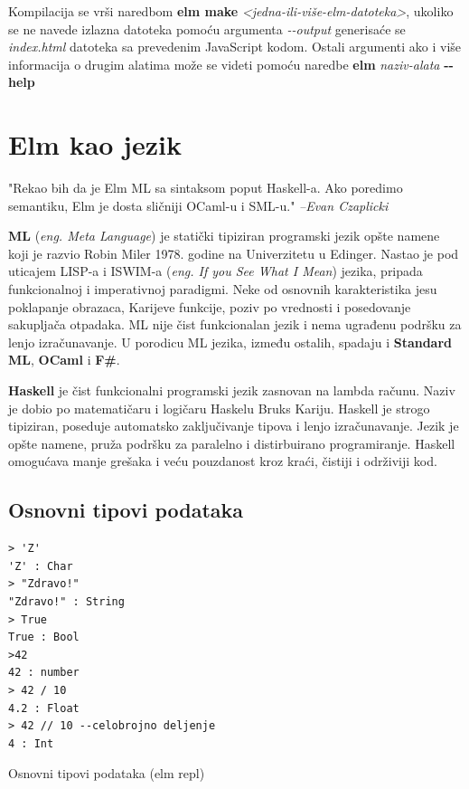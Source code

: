 \documentclass[12pt,oneside]{memoir}
\begin{document}
Kompilacija se vrši naredbom \textbf{elm make} \emph{<jedna-ili-više-elm-datoteka>},
ukoliko se ne navede izlazna datoteka pomoću argumenta \emph{-{}-output} generisaće 
se \emph{index.html} datoteka sa prevedenim JavaScript kodom. Ostali argumenti ako i
više informacija o drugim alatima može se videti pomoću naredbe \textbf{elm} 
\emph{naziv-alata} \textbf{-{}-help}

\section{Elm kao jezik}
\begin{displayquote}
"Rekao bih da je Elm ML sa sintaksom poput Haskell-a. Ako poredimo semantiku, Elm je
dosta  sličniji OCaml-u i SML-u." \emph{--Evan Czaplicki \cite{eczaplicki:2015}} 
\end{displayquote}

\textbf{ML} (\emph{eng. Meta Language}) je statički tipiziran programski jezik opšte 
namene koji je razvio Robin Miler 1978. godine na Univerzitetu u Edinger. Nastao je pod 
uticajem LISP-a i ISWIM-a (\emph{eng. If you See What I Mean}) jezika, pripada 
funkcionalnoj i imperativnoj paradigmi. Neke od osnovnih karakteristika jesu poklapanje 
obrazaca, Karijeve funkcije, poziv po vrednosti i posedovanje sakupljača otpadaka. ML nije 
čist funkcionalan jezik i nema ugrađenu podršku za lenjo izračunavanje. U porodicu ML 
jezika, između ostalih, spadaju i \textbf{Standard ML}, \textbf{OCaml} i \textbf{F{\#}}.


\textbf{Haskell} je čist funkcionalni programski jezik zasnovan na lambda računu.
Naziv je dobio po matematičaru i logičaru Haskelu Bruks Kariju. Haskell je strogo 
tipiziran, poseduje automatsko zaključivanje tipova i lenjo izračunavanje. Jezik je 
opšte namene, pruža podršku za paralelno i distirbuirano programiranje. Haskell 
omogućava manje grešaka i veću pouzdanost kroz kraći, čistiji i održiviji kod.


\subsection{Osnovni tipovi podataka}
\begin{listing}[ht]
\begin{verbatim}
> 'Z'
'Z' : Char
> "Zdravo!"
"Zdravo!" : String
> True
True : Bool
>42
42 : number
> 42 / 10 
4.2 : Float
> 42 // 10 --celobrojno deljenje
4 : Int
\end{verbatim}
\caption{Osnovni tipovi podataka (elm repl)}
\label{listing:tipovi}
\end{listing}
\end{document}
